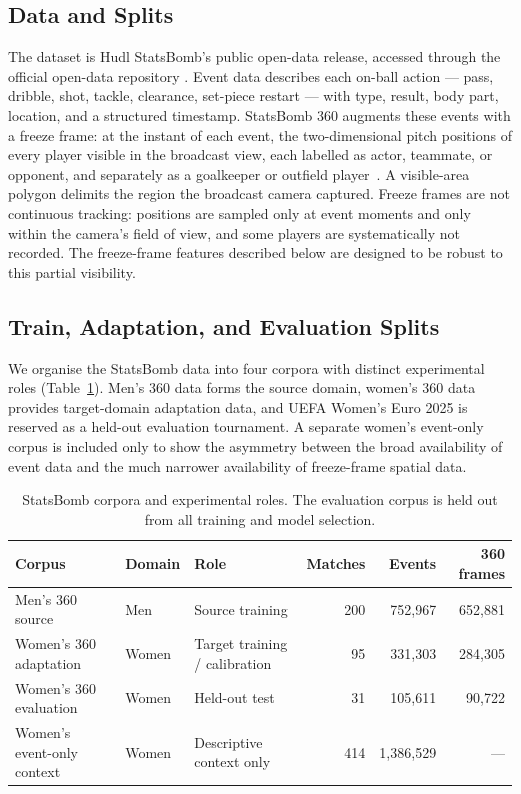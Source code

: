 \documentclass[runningheads]{llncs}
\begin{document}
\subsection{Data and Splits}

The dataset is Hudl StatsBomb's public open-data release, accessed through the official open-data repository \cite{statsbomb2026opendata}. Event data describes each on-ball action --- pass, dribble, shot, tackle, clearance, set-piece restart --- with type, result, body part, location, and a structured timestamp. StatsBomb 360 augments these events with a freeze frame: at the instant of each event, the two-dimensional pitch positions of every player visible in the broadcast view, each labelled as actor, teammate, or opponent, and separately as a goalkeeper or outfield player~\cite{statsbomb2021freezeframe}. A visible-area polygon delimits the region the broadcast camera captured. Freeze frames are not continuous tracking: positions are sampled only at event moments and only within the camera's field of view, and some players are systematically not recorded. The freeze-frame features described below are designed to be robust to this partial visibility.

\subsection{Train, Adaptation, and Evaluation Splits}
We organise the StatsBomb data into four corpora with distinct experimental roles (Table~\ref{tab:corpora}). Men's 360 data forms the source domain, women's 360 data provides target-domain adaptation data, and UEFA Women's Euro 2025 is reserved as a held-out evaluation tournament. A separate women's event-only corpus is included only to show the asymmetry between the broad availability of event data and the much narrower availability of freeze-frame spatial data.

\begin{table}[!htbp]
\centering
\scriptsize
\caption{StatsBomb corpora and experimental roles. The evaluation corpus is held out from all training and model selection.}
\label{tab:corpora}
\begin{tabular}{@{}ll l r r r@{}}
\toprule
\textbf{Corpus} & \textbf{Domain} & \textbf{Role} &
\textbf{Matches} & \textbf{Events} & \textbf{360 frames} \\
\midrule
Men's 360 source
& Men
& Source training
& 200
& 752{,}967
& 652{,}881 \\

Women's 360 adaptation
& Women
& Target training / calibration
& 95
& 331{,}303
& 284{,}305 \\

Women's 360 evaluation
& Women
& Held-out test
& 31
& 105{,}611
& 90{,}722 \\

Women's event-only context
& Women
& Descriptive context only
& 414
& 1{,}386{,}529
& --- \\
\bottomrule
\end{tabular}
\end{table}
\end{document}
